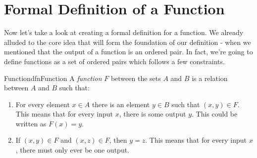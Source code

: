 \section{Formal Definition of a Function}

Now let's take a look at creating a formal definition for a function. We already alluded to the core idea that will form the foundation of our definition - when we mentioned that the output of a function is an ordered pair. In fact, we're going to define functions as a set of ordered pairs which follows a few constraints.

\begin{dfn}[label={def:function}]{Function}{dfnFunction}
    A \emph{function} $F$ between the sets $A$ and $B$ is a relation between $A$ and $B$ such that:
    \begin{enumerate}
        \item For every element $x \in A$ there is an element $y \in B$ such that $(x,y) \in F$. This means that for every input $x$, there is some output $y$. This could be written as $F(x) = y$.
        \item If $(x,y) \in F$ and $(x,z) \in F$, then $y = z$. This means that for every input $x$, there must only ever be one output.
    \end{enumerate}
\end{dfn}

